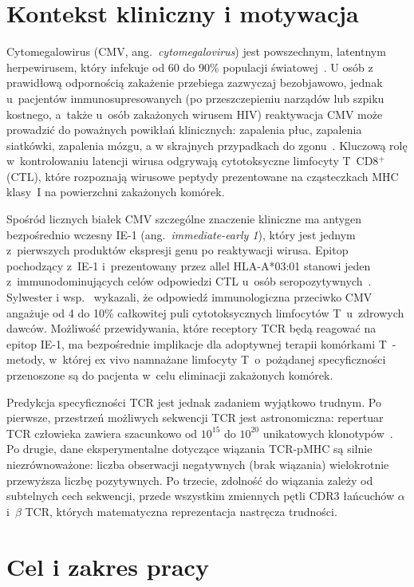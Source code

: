 \documentclass{SGGW-thesis}
\begin{document}
\section{Kontekst kliniczny i motywacja}

Cytomegalowirus (CMV, ang.\ \textit{cytomegalovirus}) jest powszechnym, latentnym herpewirusem, który
infekuje od 60 do 90\% populacji światowej~\cite{sylwester2005}. U osób z prawidłową odpornością
zakażenie przebiega zazwyczaj bezobjawowo, jednak u~pacjentów immunosupresowanych (po przeszczepieniu
narządów lub szpiku kostnego, a~także u~osób zakażonych wirusem HIV) reaktywacja CMV może prowadzić
do poważnych powikłań klinicznych: zapalenia płuc, zapalenia siatkówki, zapalenia mózgu, a w skrajnych
przypadkach do zgonu~\cite{wills1996}. Kluczową rolę w~kontrolowaniu latencji wirusa odgrywają
cytotoksyczne limfocyty T~CD8$^+$ (CTL), które rozpoznają wirusowe peptydy prezentowane na cząsteczkach
MHC klasy~I na powierzchni zakażonych komórek.

Spośród licznych białek CMV szczególne znaczenie kliniczne ma antygen bezpośrednio wczesny IE-1
(ang.\ \textit{immediate-early 1}), który jest jednym z~pierwszych produktów ekspresji genu po
reaktywacji wirusa. Epitop pochodzący z~IE-1 i~prezentowany przez allel HLA-A*03:01 stanowi jeden
z~immunodominujących celów odpowiedzi CTL u~osób seropozytywnych~\cite{wills1996,sylwester2005}.
Sylwester i wsp.~\cite{sylwester2005} wykazali, że odpowiedź immunologiczna przeciwko CMV angażuje
od 4 do 10\% całkowitej puli cytotoksycznych limfocytów T~u~zdrowych dawców. Możliwość przewidywania,
które receptory TCR będą reagować na epitop IE-1, ma bezpośrednie implikacje dla adoptywnej terapii
komórkami T~- metody, w~której ex vivo namnażane limfocyty T~o~pożądanej specyficzności przenoszone
są do pacjenta w~celu eliminacji zakażonych komórek.

Predykcja specyficzności TCR jest jednak zadaniem wyjątkowo trudnym. Po pierwsze, przestrzeń możliwych
sekwencji TCR jest astronomiczna: repertuar TCR człowieka zawiera szacunkowo od $10^{15}$ do $10^{20}$
unikatowych klonotypów~\cite{moris2021}. Po drugie, dane eksperymentalne dotyczące wiązania TCR-pMHC
są silnie niezrównoważone: liczba obserwacji negatywnych (brak wiązania) wielokrotnie przewyższa
liczbę pozytywnych. Po trzecie, zdolność do wiązania zależy od subtelnych cech sekwencji, przede
wszystkim zmiennych pętli CDR3 łańcuchów $\alpha$ i~$\beta$ TCR, których matematyczna reprezentacja
nastręcza trudności.

\section{Cel i zakres pracy}
\end{document}
